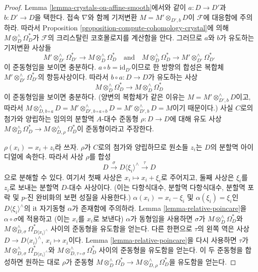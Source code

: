 \begin{proof}
Lemma \ref{lemma-crystals-on-affine-smooth}에서와 같이
$a : D \to D'$과 $b : D' \to D$을 택한다. 접속 $\nabla$와 함께
기저변환 $M = M' \otimes_{D', b} D$이 $\mathcal{F}$에 대응함에
주의하라. 따라서 Proposition
\ref{proposition-compute-cohomology-crystal}에 의해
$M \otimes^\wedge_D \Omega_D^*$가 $\mathcal{F}$의 크리스탈린
코호몰로지를 계산함을 안다. 그러므로 $a$와 $b$가 유도하는
기저변환 사상들
$$
M' \otimes^\wedge_{D'} \Omega^*_{D'}
\longrightarrow
M \otimes^\wedge_D \Omega^*_D
\quad\text{and}\quad
M \otimes^\wedge_D \Omega^*_D
\longrightarrow
M' \otimes^\wedge_{D'} \Omega^*_{D'}
$$
이 준동형임을 보이면 충분하다. $a \circ b = \text{id}_{D'}$이므로
한 방향의 합성은 복합체
$M' \otimes^\wedge_{D'} \Omega^*_{D'}$의 항등사상이다. 따라서
$b \circ a : D \to D$가 유도하는 사상
$$
M \otimes^\wedge_D \Omega^*_D
\longrightarrow
M \otimes^\wedge_D \Omega^*_D
$$
이 준동형임을 보이면 충분하다. (양변의 복합체가 같은 이유는
$M = M' \otimes^\wedge_{D', b} D$이고, 따라서
$M \otimes^\wedge_{D, b \circ a} D =
M' \otimes^\wedge_{D', b \circ a \circ b} D =
M' \otimes^\wedge_{D', b} D = M$이기 때문이다.) 사실 $C$로의
첨가와 양립하는 임의의 분할멱 $A$-대수 준동형
$\rho : D \to D$에 대해 유도 사상
$M \otimes^\wedge_D \Omega^*_D \to
M \otimes^\wedge_{D, \rho} \Omega^*_D$이 준동형이라고 주장한다.

\medskip\noindent
$\rho(x_i) = x_i + z_i$라 쓰자. $\rho$가 $C$로의 첨가와
양립하므로 원소들 $z_i$는 $D$의 분할멱 아이디얼에 속한다.
따라서 사상 $\rho$를 합성
$$
D \xrightarrow{\sigma} D\langle \xi_i \rangle^\wedge \xrightarrow{\tau} D
$$
으로 분해할 수 있다. 여기서 첫째 사상은
$x_i \mapsto x_i + \xi_i$로 주어지고, 둘째 사상은 $\xi_i$를
$z_i$로 보내는 분할멱 $D$-대수 사상이다. (이는 다항식대수,
분할멱 다항식대수, 분할멱 포락 및 $p$-진 완비화의 보편 성질을
사용한다.) $\alpha(x_i) = x_i - \xi_i$ 및
$\alpha(\xi_i) = \xi_i$인 $D\langle \xi_i \rangle^\wedge$의
{it 자기동형} $\alpha$가 존재함에 주의하라. Lemma
\ref{lemma-relative-poincare}을 $\alpha \circ \sigma$에 적용하고
(이는 $x_i$를 $x_i$로 보낸다) $\alpha$가 동형임을 사용하면
$\sigma$가 $M \otimes^\wedge_D \Omega^*_D$와
$M \otimes^\wedge_{D, \sigma} \Omega^*_{D\langle x_i \rangle^\wedge}$
사이의 준동형을 유도함을 얻는다. 다른 한편으로 $\tau$의 왼쪽
역은 사상 $D \to D\langle x_i \rangle^\wedge$,
$x_i \mapsto x_i$이다. Lemma \ref{lemma-relative-poincare}을 다시
사용하면 $\tau$가
$M \otimes^\wedge_{D, \sigma} \Omega^*_{D\langle x_i \rangle^\wedge}$와
$M \otimes^\wedge_{D, \tau \circ \sigma} \Omega^*_D$ 사이의
준동형을 유도함을 얻는다. 이 두 준동형을 합성하면 원하는 대로
$\rho$가 준동형
$M \otimes^\wedge_D \Omega^*_D \to
M \otimes^\wedge_{D, \rho} \Omega^*_D$을 유도함을 얻는다.
\end{proof}











